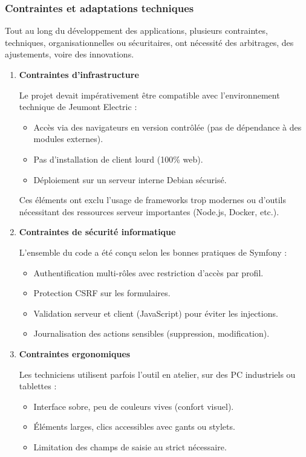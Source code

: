 \documentclass[11pt,a4paper]{article}
\begin{document}
\subsubsection{Contraintes et adaptations techniques}

Tout au long du développement des applications, plusieurs contraintes, techniques, organisationnelles ou sécuritaires, ont nécessité des arbitrages, des ajustements, voire des innovations.
\begin{enumerate}


\item \textbf{Contraintes d’infrastructure} 

Le projet devait impérativement être compatible avec l’environnement technique de Jeumont Electric :
\begin{itemize}
    \item Accès via des navigateurs en version contrôlée (pas de dépendance à des modules externes).
    \item Pas d’installation de client lourd (100\% web).
    \item Déploiement sur un serveur interne Debian sécurisé.
\end{itemize}
Ces éléments ont exclu l’usage de frameworks trop modernes ou d’outils nécessitant des ressources serveur importantes (Node.js, Docker, etc.).

\item \textbf{Contraintes de sécurité informatique} \

L’ensemble du code a été conçu selon les bonnes pratiques de Symfony :
\begin{itemize}
    \item Authentification multi-rôles avec restriction d’accès par profil.
    \item Protection CSRF sur les formulaires.
    \item Validation serveur et client (JavaScript) pour éviter les injections.
    \item Journalisation des actions sensibles (suppression, modification).
\end{itemize}

\item \textbf{Contraintes ergonomiques}

Les techniciens utilisent parfois l’outil en atelier, sur des PC industriels ou tablettes :
\begin{itemize}
    \item Interface sobre, peu de couleurs vives (confort visuel).
    \item Éléments larges, clics accessibles avec gants ou stylets.
    \item Limitation des champs de saisie au strict nécessaire.
\end{itemize}


\end{enumerate}
\end{document}
